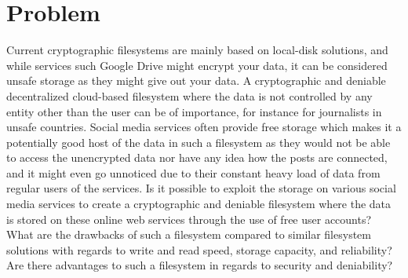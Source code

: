
\section{Problem}
\label{sec:problem}

Current cryptographic filesystems are mainly based on local-disk solutions, and while services such Google Drive might encrypt your data, it can be considered unsafe storage as they might give out your data. A cryptographic and deniable decentralized cloud-based filesystem where the data is not controlled by any entity other than the user can be of importance, for instance for journalists in unsafe countries. Social media services often provide free storage which makes it a potentially good host of the data in such a filesystem as they would not be able to access the unencrypted data nor have any idea how the posts are connected, and it might even go unnoticed due to their constant heavy load of data from regular users of the services. Is it possible to exploit the storage on various social media services to create a cryptographic and deniable filesystem where the data is stored on these online web services through the use of free user accounts? What are the drawbacks of such a filesystem compared to similar filesystem solutions with regards to write and read speed, storage capacity, and reliability? Are there advantages to such a filesystem in regards to security and deniability? 




